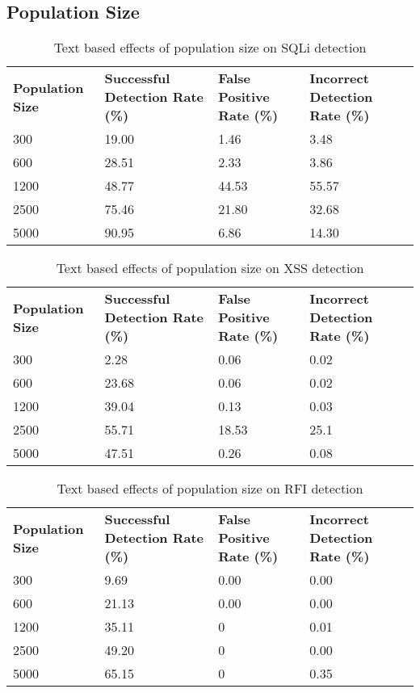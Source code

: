 \begin{appendices}
\section{Population Size}
\begin{table}[h]
	\centering
	\begin{tabular}{|p{1.5in}|p{1in}|p{1in}|p{1in}|}
	\hline
	\textbf{Population Size} & \textbf{Successful Detection Rate (\%)} & \textbf{False Positive Rate (\%)} & \textbf{Incorrect Detection Rate (\%)}  \\
	\hhline{|=|=|=|=|}
	300 & 19.00 & 1.46 & 3.48 \\
	\hline
	600 & 28.51 & 2.33 & 3.86 \\
	\hline
	1200 & 48.77 & 44.53 & 55.57 \\
	\hline
	2500 & 75.46 & 21.80 & 32.68 \\
	\hline
	5000 & 90.95 & 6.86 & 14.30 \\
	\hline
	\end{tabular}
	\caption[]{Text based effects of population size on SQLi detection}
	\label{app:sqlPopulationText}
\end{table}
\begin{table}[h]
	\centering
	\begin{tabular}{|p{1.5in}|p{1in}|p{1in}|p{1in}|}
	\hline
	\textbf{Population Size} & \textbf{Successful Detection Rate (\%)} & \textbf{False Positive Rate (\%)} & \textbf{Incorrect Detection Rate (\%)}  \\
	\hhline{|=|=|=|=|}
	300 & 2.28 & 0.06 & 0.02 \\
	\hline
	600 & 23.68 & 0.06 & 0.02 \\
	\hline
	1200 & 39.04 & 0.13 & 0.03 \\
	\hline
	2500 & 55.71 & 18.53 & 25.1 \\
	\hline
	5000 & 47.51 & 0.26 & 0.08 \\
	\hline
	\end{tabular}
	\caption[]{Text based effects of population size on XSS detection}
	\label{app:xssPopulationText}
\end{table}
\begin{table}[h]
	\centering
	\begin{tabular}{|p{1.5in}|p{1in}|p{1in}|p{1in}|}
	\hline
	\textbf{Population Size} & \textbf{Successful Detection Rate (\%)} & \textbf{False Positive Rate (\%)} & \textbf{Incorrect Detection Rate (\%)}  \\
	\hhline{|=|=|=|=|}
	300 & 9.69 & 0.00 & 0.00 \\
	\hline
	600 & 21.13 & 0.00 & 0.00 \\
	\hline
	1200 & 35.11 & 0 & 0.01 \\
	\hline
	2500 & 49.20 & 0 & 0.00 \\
	\hline
	5000 & 65.15 & 0 & 0.35 \\
	\hline
	\end{tabular}
	\caption[]{Text based effects of population size on RFI detection}
	\label{app:rfiPopulationText}
\end{table}


\end{appendices}
